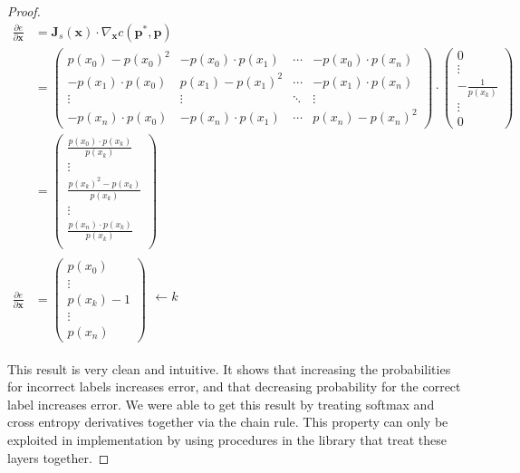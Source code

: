 \documentclass[11pt]{article}
\newcommand{\pd}{\partial}
\newcommand{\bs}{\boldsymbol}
\begin{document}
\begin{proof}
	\begin{align}
		\frac{\pd e}{\pd \bs{x}} &= \bs{J}_s(\bs{x})
		\cdot
		\nabla_{\bs{x}}c(\bs{p}^*, \bs{p})
		\\
		&=
		\begin{pmatrix}
			p(x_{0}) - p(x_{0})^2
				& - p(x_{0})\cdot p(x_{1})
				& \cdots
				& -p(x_{0})\cdot p(x_{n})
			\\
			-p(x_{1}) \cdot p(x_{0})
				& p(x_{1})-p(x_{1})^2
				& \cdots
				& -p(x_{1})\cdot p(x_{n})
			\\
			\vdots
				& \vdots
				& \ddots
				& \vdots
			\\
			-p(x_{n}) \cdot p(x_{0})
				& -p(x_{n})\cdot p(x_{1})
				& \cdots
				& p(x_{n}) - p(x_{n})^2
		\end{pmatrix}
		\cdot
		\begin{pmatrix}
			0 \\
			\vdots \\
			-\frac{1}{p(x_k)} \\
			\vdots \\
			0
		\end{pmatrix}
		\\
		&=
		\begin{pmatrix}
			\frac{p(x_{0}) \cdot p(x_{k})}{p(x_k)} \\
			\vdots \\
			\frac{p(x_{k})^2 - p(x_{k})}{p(x_k)} \\
			\vdots \\
			\frac{p(x_{n}) \cdot p(x_{k})}{p(x_k)} \\
		\end{pmatrix}
		\\
		\frac{\pd e}{\pd \bs{x}}
		&=
		\begin{pmatrix}
			p(x_{0}) \\
			\vdots \\
			p(x_{k})-1 \\
			\vdots \\
			p(x_{n})
		\end{pmatrix}
		\begin{matrix}
			\phantom{p(x_{0})} \\
			\phantom{\vdots} \\
			\leftarrow k \phantom{p(x_{k})-1} \\
			\phantom{\vdots} \\
			\phantom{p(x_{n})} \\
		\end{matrix}
	\end{align}

	This result is very clean and intuitive. It shows that increasing the
	probabilities for incorrect labels increases error, and that decreasing
	probability for the correct label increases error. We were able to get this
	result by treating softmax and cross entropy derivatives together via the
	chain rule. This property can only be exploited in implementation by using
	procedures in the library that treat these layers together.

\end{proof}
\end{document}
